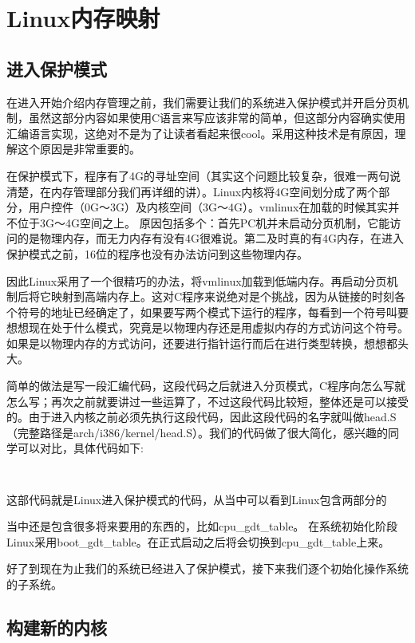



\chapter{Linux内存映射}

\section{进入保护模式}
在进入开始介绍内存管理之前，我们需要让我们的系统进入保护模式并开启分页机制，虽然这部分内容如果使用C语言来写应该非常的简单，但这部分内容确实使用汇编语言实现，这绝对不是为了让读者看起来很cool。采用这种技术是有原因，理解这个原因是非常重要的。

在保护模式下，程序有了4G的寻址空间（其实这个问题比较复杂，很难一两句说清楚，在内存管理部分我们再详细的讲）。Linux内核将4G空间划分成了两个部分，用户控件（0G～3G）及内核空间（3G～4G）。vmlinux在加载的时候其实并不位于3G～4G空间之上。
原因包括多个：首先PC机并未启动分页机制，它能访问的是物理内存，而无力内存有没有4G很难说。第二及时真的有4G内存，在进入保护模式之前，16位的程序也没有办法访问到这些物理内存。

因此Linux采用了一个很精巧的办法，将vmlinux加载到低端内存。再启动分页机制后将它映射到高端内存上。这对C程序来说绝对是个挑战，因为从链接的时刻各个符号的地址已经确定了，如果要写两个模式下运行的程序，每看到一个符号叫要想想现在处于什么模式，究竟是以物理内存还是用虚拟内存的方式访问这个符号。如果是以物理内存的方式访问，还要进行指针运行而后在进行类型转换，想想都头大。

简单的做法是写一段汇编代码，这段代码之后就进入分页模式，C程序向怎么写就怎么写；再次之前就要讲过一些运算了，不过这段代码比较短，整体还是可以接受的。由于进入内核之前必须先执行这段代码，因此这段代码的名字就叫做head.S（完整路径是arch/i386/kernel/head.S）。我们的代码做了很大简化，感兴趣的同学可以对比，具体代码如下:
\begin{lstlisting}
	
\end{lstlisting}
这部代码就是Linux进入保护模式的代码，从当中可以看到Linux包含两部分的

当中还是包含很多将来要用的东西的，比如cpu\_gdt\_table。 在系统初始化阶段Linux采用boot\_gdt\_table。在正式启动之后将会切换到cpu\_gdt\_table上来。

好了到现在为止我们的系统已经进入了保护模式，接下来我们逐个初始化操作系统的子系统。


\section{构建新的内核}

